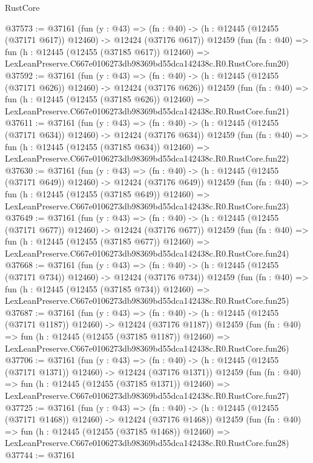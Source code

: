 \begin{lexlean}{RustCore}
\begin{coremodule}
@37573 := @37161
    (fun (y : @43) =>
    (fn : @40) -> (h : @12445 (@12455 (@37171 @617)) @12460) -> @12424 (@37176 @617))
    @12459
    (fun (fn : @40) =>
    fun (h : @12445 (@12455 (@37185 @617)) @12460) =>
    LexLeanPreserve.C667e0106273db98369bd55dca142438c.R0.RustCore.fun20)
@37592 := @37161
    (fun (y : @43) =>
    (fn : @40) -> (h : @12445 (@12455 (@37171 @626)) @12460) -> @12424 (@37176 @626))
    @12459
    (fun (fn : @40) =>
    fun (h : @12445 (@12455 (@37185 @626)) @12460) =>
    LexLeanPreserve.C667e0106273db98369bd55dca142438c.R0.RustCore.fun21)
@37611 := @37161
    (fun (y : @43) =>
    (fn : @40) -> (h : @12445 (@12455 (@37171 @634)) @12460) -> @12424 (@37176 @634))
    @12459
    (fun (fn : @40) =>
    fun (h : @12445 (@12455 (@37185 @634)) @12460) =>
    LexLeanPreserve.C667e0106273db98369bd55dca142438c.R0.RustCore.fun22)
@37630 := @37161
    (fun (y : @43) =>
    (fn : @40) -> (h : @12445 (@12455 (@37171 @649)) @12460) -> @12424 (@37176 @649))
    @12459
    (fun (fn : @40) =>
    fun (h : @12445 (@12455 (@37185 @649)) @12460) =>
    LexLeanPreserve.C667e0106273db98369bd55dca142438c.R0.RustCore.fun23)
@37649 := @37161
    (fun (y : @43) =>
    (fn : @40) -> (h : @12445 (@12455 (@37171 @677)) @12460) -> @12424 (@37176 @677))
    @12459
    (fun (fn : @40) =>
    fun (h : @12445 (@12455 (@37185 @677)) @12460) =>
    LexLeanPreserve.C667e0106273db98369bd55dca142438c.R0.RustCore.fun24)
@37668 := @37161
    (fun (y : @43) =>
    (fn : @40) -> (h : @12445 (@12455 (@37171 @734)) @12460) -> @12424 (@37176 @734))
    @12459
    (fun (fn : @40) =>
    fun (h : @12445 (@12455 (@37185 @734)) @12460) =>
    LexLeanPreserve.C667e0106273db98369bd55dca142438c.R0.RustCore.fun25)
@37687 := @37161
    (fun (y : @43) =>
    (fn : @40) -> (h : @12445 (@12455 (@37171 @1187)) @12460) -> @12424 (@37176 @1187))
    @12459
    (fun (fn : @40) =>
    fun (h : @12445 (@12455 (@37185 @1187)) @12460) =>
    LexLeanPreserve.C667e0106273db98369bd55dca142438c.R0.RustCore.fun26)
@37706 := @37161
    (fun (y : @43) =>
    (fn : @40) -> (h : @12445 (@12455 (@37171 @1371)) @12460) -> @12424 (@37176 @1371))
    @12459
    (fun (fn : @40) =>
    fun (h : @12445 (@12455 (@37185 @1371)) @12460) =>
    LexLeanPreserve.C667e0106273db98369bd55dca142438c.R0.RustCore.fun27)
@37725 := @37161
    (fun (y : @43) =>
    (fn : @40) -> (h : @12445 (@12455 (@37171 @1468)) @12460) -> @12424 (@37176 @1468))
    @12459
    (fun (fn : @40) =>
    fun (h : @12445 (@12455 (@37185 @1468)) @12460) =>
    LexLeanPreserve.C667e0106273db98369bd55dca142438c.R0.RustCore.fun28)
@37744 := @37161

\end{coremodule}
\end{lexlean}
